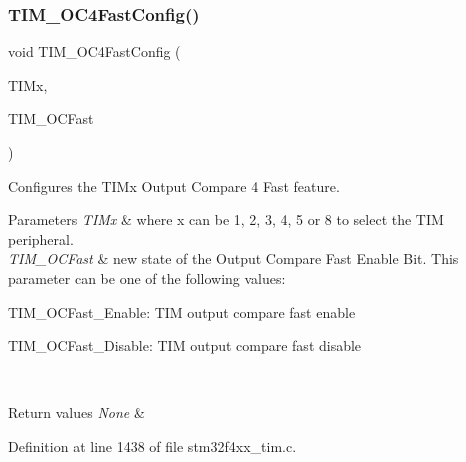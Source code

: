 \mbox{\label{group___t_i_m_ga58279a04e8ea5333f1079d3cce8dde12}} 
\subsubsection{\texorpdfstring{T\+I\+M\+\_\+\+O\+C4\+Fast\+Config()}{TIM\_OC4FastConfig()}}
{\footnotesize\ttfamily void T\+I\+M\+\_\+\+O\+C4\+Fast\+Config (\begin{DoxyParamCaption}\item[{\hyperlink{struct_t_i_m___type_def}{T\+I\+M\+\_\+\+Type\+Def} $\ast$}]{T\+I\+Mx,  }\item[{uint16\+\_\+t}]{T\+I\+M\+\_\+\+O\+C\+Fast }\end{DoxyParamCaption})}



Configures the T\+I\+Mx Output Compare 4 Fast feature. 


\begin{DoxyParams}{Parameters}
{\em T\+I\+Mx} & where x can be 1, 2, 3, 4, 5 or 8 to select the T\+IM peripheral. \\
\hline
{\em T\+I\+M\+\_\+\+O\+C\+Fast} & new state of the Output Compare Fast Enable Bit. This parameter can be one of the following values\+: \begin{DoxyItemize}
\item T\+I\+M\+\_\+\+O\+C\+Fast\+\_\+\+Enable\+: T\+IM output compare fast enable \item T\+I\+M\+\_\+\+O\+C\+Fast\+\_\+\+Disable\+: T\+IM output compare fast disable \end{DoxyItemize}
\\
\hline
\end{DoxyParams}

\begin{DoxyRetVals}{Return values}
{\em None} & \\
\hline
\end{DoxyRetVals}


Definition at line 1438 of file stm32f4xx\+\_\+tim.\+c.

\mbox{\label{group___t_i_m_ga64571ebbb58cac39a9e760050175f11c}} 
